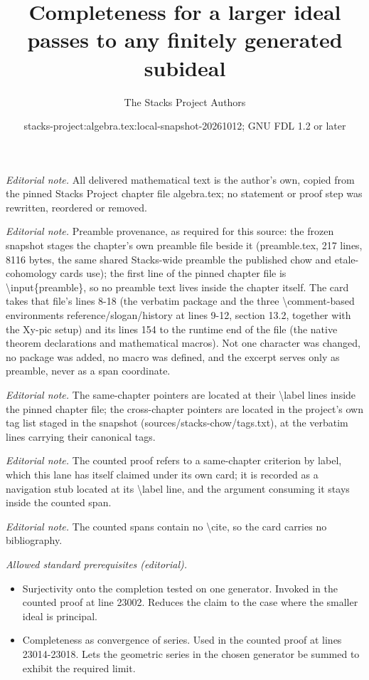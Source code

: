 \documentclass[10pt,a4paper]{amsart}
\title{Completeness for a larger ideal passes to any finitely generated subideal}
\author{The Stacks Project Authors}
\date{stacks-project:algebra.tex:local-snapshot-20261012; GNU FDL 1.2 or later}
\theoremstyle{plain}
\theoremstyle{definition}
\theoremstyle{remark}
\numberwithin{equation}{subsection}
\begin{document}
\maketitle
\noindent\textit{Editorial note.} All delivered mathematical text is the author's own, copied from the pinned Stacks Project chapter file algebra.tex; no statement or proof step was rewritten, reordered or removed.\par\medskip
\noindent\textit{Editorial note.} Preamble provenance, as required for this source: the frozen snapshot stages the chapter's own preamble file beside it (preamble.tex, 217 lines, 8116 bytes, the same shared Stacks-wide preamble the published chow and etale-cohomology cards use); the first line of the pinned chapter file is \textbackslash{}input\{preamble\}, so no preamble text lives inside the chapter itself. The card takes that file's lines 8-18 (the verbatim package and the three \textbackslash{}comment-based environments reference/slogan/history at lines 9-12, section 13.2, together with the Xy-pic setup) and its lines 154 to the runtime end of the file (the native theorem declarations and mathematical macros). Not one character was changed, no package was added, no macro was defined, and the excerpt serves only as preamble, never as a span coordinate.\par\medskip
\noindent\textit{Editorial note.} The same-chapter pointers are located at their \textbackslash{}label lines inside the pinned chapter file; the cross-chapter pointers are located in the project's own tag list staged in the snapshot (sources/stacks-chow/tags.txt), at the verbatim lines carrying their canonical tags.\par\medskip
\noindent\textit{Editorial note.} The counted proof refers to a same-chapter criterion by label, which this lane has itself claimed under its own card; it is recorded as a navigation stub located at its \textbackslash{}label line, and the argument consuming it stays inside the counted span.\par\medskip
\noindent\textit{Editorial note.} The counted spans contain no \textbackslash{}cite, so the card carries no bibliography.\par\medskip
\noindent\textit{Allowed standard prerequisites (editorial).}\begin{itemize}
\item Surjectivity onto the completion tested on one generator. Invoked in the counted proof at line 23002. Reduces the claim to the case where the smaller ideal is principal.
\item Completeness as convergence of series. Used in the counted proof at lines 23014-23018. Lets the geometric series in the chosen generator be summed to exhibit the required limit.
\end{itemize}\medskip
\end{document}
